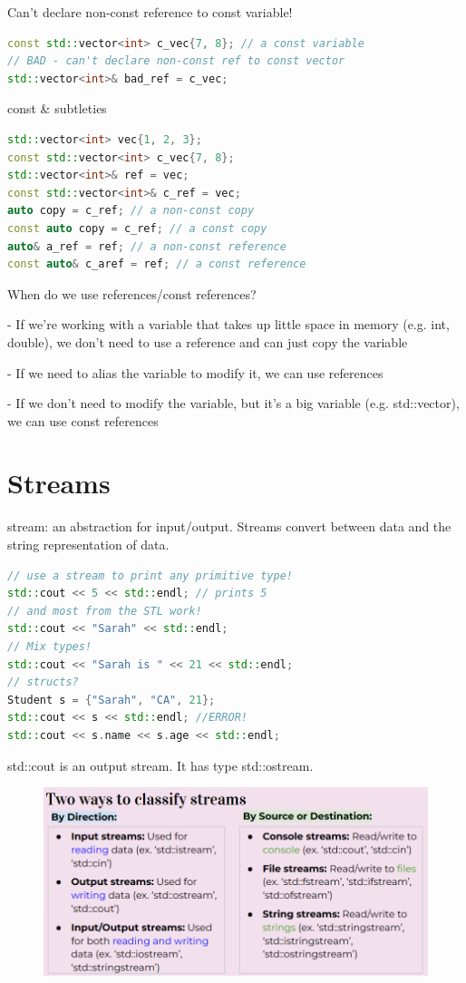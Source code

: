 \documentclass[12pt, a4paper, oneside]{ctexbook}
\begin{document}
Can’t declare non-const reference to const variable!

\begin{lstlisting}[language=c++]
const std::vector<int> c_vec{7, 8}; // a const variable
// BAD - can't declare non-const ref to const vector
std::vector<int>& bad_ref = c_vec;
\end{lstlisting}

const \& subtleties

\begin{lstlisting}[language=c++]
std::vector<int> vec{1, 2, 3};
const std::vector<int> c_vec{7, 8};
std::vector<int>& ref = vec;
const std::vector<int>& c_ref = vec;
auto copy = c_ref; // a non-const copy
const auto copy = c_ref; // a const copy
auto& a_ref = ref; // a non-const reference
const auto& c_aref = ref; // a const reference
\end{lstlisting}

When do we use references/const references?

- If we’re working with a variable that takes up little
space in memory (e.g. int, double), we don’t need to
use a reference and can just copy the variable

- If we need to alias the variable to modify it, we can
use references

- If we don’t need to modify the variable, but it’s a big
variable (e.g. std::vector), we can use const references


\section{Streams}

stream: an abstraction for
input/output. Streams
convert between
data and
the string representation
of data.


\begin{lstlisting}[language=c++]
// use a stream to print any primitive type!
std::cout << 5 << std::endl; // prints 5
// and most from the STL work!
std::cout << "Sarah" << std::endl;
// Mix types!
std::cout << "Sarah is " << 21 << std::endl;
// structs?
Student s = {"Sarah", "CA", 21};
std::cout << s << std::endl; //ERROR!
std::cout << s.name << s.age << std::endl;
\end{lstlisting}

std::cout is an
output
stream. It has type
std::ostream.

  \begin{figure}[h]
		\centering 
		\includegraphics[width=1.0\textwidth]{images4.png} 
	\end{figure}
\end{document}
